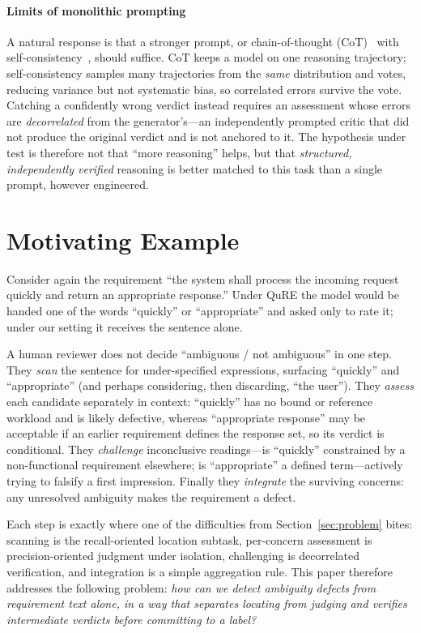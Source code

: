 \documentclass[10pt,conference]{IEEEtran}
\begin{document}
\paragraph*{Limits of monolithic prompting}
A natural response is that a stronger prompt, or chain-of-thought (CoT)~\cite{cot} with self-consistency~\cite{selfcons}, should suffice. CoT keeps a model on one reasoning trajectory; self-consistency samples many trajectories from the \emph{same} distribution and votes, reducing variance but not systematic bias, so correlated errors survive the vote. Catching a confidently wrong verdict instead requires an assessment whose errors are \emph{decorrelated} from the generator's---an independently prompted critic that did not produce the original verdict and is not anchored to it. The hypothesis under test is therefore not that ``more reasoning'' helps, but that \emph{structured, independently verified} reasoning is better matched to this task than a single prompt, however engineered.

\section{Motivating Example}
\label{sec:example}
Consider again the requirement ``the system shall process the incoming request quickly and return an appropriate response.'' Under QuRE the model would be handed one of the words ``quickly'' or ``appropriate'' and asked only to rate it; under our setting it receives the sentence alone.

A human reviewer does not decide ``ambiguous / not ambiguous'' in one step. They \emph{scan} the sentence for under-specified expressions, surfacing ``quickly'' and ``appropriate'' (and perhaps considering, then discarding, ``the user''). They \emph{assess} each candidate separately in context: ``quickly'' has no bound or reference workload and is likely defective, whereas ``appropriate response'' may be acceptable if an earlier requirement defines the response set, so its verdict is conditional. They \emph{challenge} inconclusive readings---is ``quickly'' constrained by a non-functional requirement elsewhere; is ``appropriate'' a defined term---actively trying to falsify a first impression. Finally they \emph{integrate} the surviving concerns: any unresolved ambiguity makes the requirement a defect.

Each step is exactly where one of the difficulties from Section~\ref{sec:problem} bites: scanning is the recall-oriented location subtask, per-concern assessment is precision-oriented judgment under isolation, challenging is decorrelated verification, and integration is a simple aggregation rule. This paper therefore addresses the following problem: \emph{how can we detect ambiguity defects from requirement text alone, in a way that separates locating from judging and verifies intermediate verdicts before committing to a label?}
\end{document}
